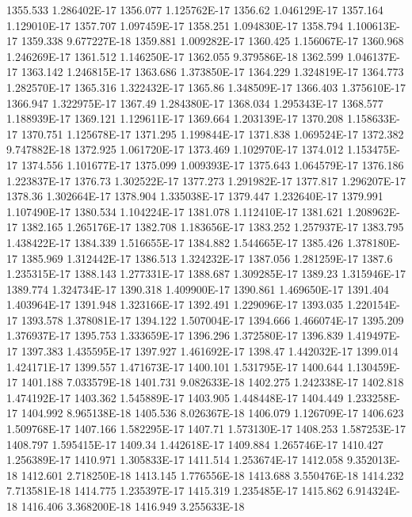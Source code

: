 1355.533  1.286402E-17
1356.077  1.125762E-17
1356.62  1.046129E-17
1357.164  1.129010E-17
1357.707  1.097459E-17
1358.251  1.094830E-17
1358.794  1.100613E-17
1359.338  9.677227E-18
1359.881  1.009282E-17
1360.425  1.156067E-17
1360.968  1.246269E-17
1361.512  1.146250E-17
1362.055  9.379586E-18
1362.599  1.046137E-17
1363.142  1.246815E-17
1363.686  1.373850E-17
1364.229  1.324819E-17
1364.773  1.282570E-17
1365.316  1.322432E-17
1365.86  1.348509E-17
1366.403  1.375610E-17
1366.947  1.322975E-17
1367.49  1.284380E-17
1368.034  1.295343E-17
1368.577  1.188939E-17
1369.121  1.129611E-17
1369.664  1.203139E-17
1370.208  1.158633E-17
1370.751  1.125678E-17
1371.295  1.199844E-17
1371.838  1.069524E-17
1372.382  9.747882E-18
1372.925  1.061720E-17
1373.469  1.102970E-17
1374.012  1.153475E-17
1374.556  1.101677E-17
1375.099  1.009393E-17
1375.643  1.064579E-17
1376.186  1.223837E-17
1376.73  1.302522E-17
1377.273  1.291982E-17
1377.817  1.296207E-17
1378.36  1.302664E-17
1378.904  1.335038E-17
1379.447  1.232640E-17
1379.991  1.107490E-17
1380.534  1.104224E-17
1381.078  1.112410E-17
1381.621  1.208962E-17
1382.165  1.265176E-17
1382.708  1.183656E-17
1383.252  1.257937E-17
1383.795  1.438422E-17
1384.339  1.516655E-17
1384.882  1.544665E-17
1385.426  1.378180E-17
1385.969  1.312442E-17
1386.513  1.324232E-17
1387.056  1.281259E-17
1387.6  1.235315E-17
1388.143  1.277331E-17
1388.687  1.309285E-17
1389.23  1.315946E-17
1389.774  1.324734E-17
1390.318  1.409900E-17
1390.861  1.469650E-17
1391.404  1.403964E-17
1391.948  1.323166E-17
1392.491  1.229096E-17
1393.035  1.220154E-17
1393.578  1.378081E-17
1394.122  1.507004E-17
1394.666  1.466074E-17
1395.209  1.376937E-17
1395.753  1.333659E-17
1396.296  1.372580E-17
1396.839  1.419497E-17
1397.383  1.435595E-17
1397.927  1.461692E-17
1398.47  1.442032E-17
1399.014  1.424171E-17
1399.557  1.471673E-17
1400.101  1.531795E-17
1400.644  1.130459E-17
1401.188  7.033579E-18
1401.731  9.082633E-18
1402.275  1.242338E-17
1402.818  1.474192E-17
1403.362  1.545889E-17
1403.905  1.448448E-17
1404.449  1.233258E-17
1404.992  8.965138E-18
1405.536  8.026367E-18
1406.079  1.126709E-17
1406.623  1.509768E-17
1407.166  1.582295E-17
1407.71  1.573130E-17
1408.253  1.587253E-17
1408.797  1.595415E-17
1409.34  1.442618E-17
1409.884  1.265746E-17
1410.427  1.256389E-17
1410.971  1.305833E-17
1411.514  1.253674E-17
1412.058  9.352013E-18
1412.601  2.718250E-18
1413.145  1.776556E-18
1413.688  3.550476E-18
1414.232  7.713581E-18
1414.775  1.235397E-17
1415.319  1.235485E-17
1415.862  6.914324E-18
1416.406  3.368200E-18
1416.949  3.255633E-18
